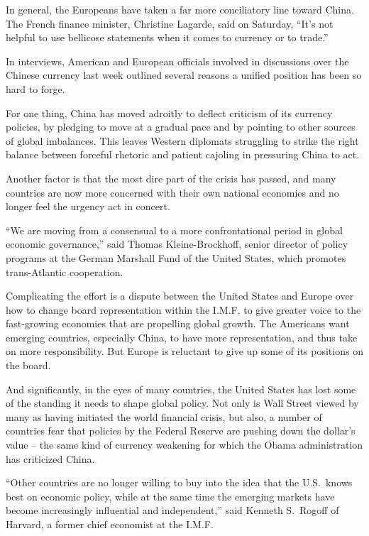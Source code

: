 ﻿\documentclass[12pt]{article}
\begin{document}
In general, the Europeans have taken a far more conciliatory line toward China. The French finance
minister, Christine Lagarde, said on Saturday, ``It's not helpful to use bellicose statements when
it comes to currency or to trade.''

In interviews, American and European officials involved in discussions over the Chinese currency
last week outlined several reasons a unified position has been so hard to forge.

For one thing, China has moved adroitly to deflect criticism of its currency policies, by pledging
to move at a gradual pace and by pointing to other sources of global imbalances. This leaves Western
diplomats struggling to strike the right balance between forceful rhetoric and patient cajoling in
pressuring China to act.

Another factor is that the most dire part of the crisis has passed, and many countries are now more
concerned with their own national economies and no longer feel the urgency act in concert.

``We are moving from a consensual to a more confrontational period in global economic governance,''
said Thomas Kleine-Brockhoff, senior director of policy programs at the German Marshall Fund of the
United States, which promotes trans-Atlantic cooperation.

Complicating the effort is a dispute between the United States and Europe over how to change board
representation within the I.M.F. to give greater voice to the fast-growing economies that are
propelling global growth. The Americans want emerging countries, especially China, to have more
representation, and thus take on more responsibility. But Europe is reluctant to give up some of its
positions on the board.

And significantly, in the eyes of many countries, the United States has lost some of the standing it
needs to shape global policy. Not only is Wall Street viewed by many as having initiated the world
financial crisis, but also, a number of countries fear that policies by the Federal Reserve are
pushing down the dollar's value -- the same kind of currency weakening for which the Obama
administration has criticized China.

``Other countries are no longer willing to buy into the idea that the U.S.~knows best on economic
policy, while at the same time the emerging markets have become increasingly influential and
independent,'' said Kenneth S.~Rogoff of Harvard, a former chief economist at the I.M.F.
\end{document}
